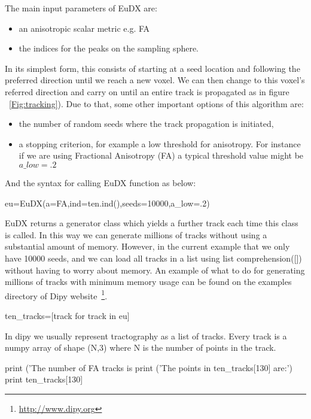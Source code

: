 The main input parameters of EuDX are:

\begin{itemize}
	\item an anisotropic scalar metric e.g. FA
        \item the indices for the peaks on the sampling sphere.
\end{itemize}

In its simplest form, this consists of starting at a seed location and following the preferred direction until we reach a new voxel. We can then change to this voxel’s referred direction and carry on until an entire track is propagated as in figure ~\ref{Fig:tracking}). Due to that, some other important options of this algorithm are:
\begin{itemize}
	\item the number of random seeds where the track propagation is initiated,
        \item a stopping criterion, for example a low threshold for anisotropy. For instance if we are using Fractional Anisotropy (FA) a typical threshold value might be $a\_low=.2$
\end{itemize}

And the syntax for calling EuDX function as below: 
\begin{python}
eu=EuDX(a=FA,ind=ten.ind(),seeds=10000,a_low=.2)
\end{python}


EuDX returns a generator class which yields a further track each time this class is called. In this way we can generate millions of tracks without using a substantial amount of memory. However, in the current example that we only have 10000 seeds, and we can load all tracks in a list using list comprehension([]) without having to worry about memory. An example of what to do for generating millions of tracks with minimum memory usage can be found on the examples directory of Dipy website~\footnote{\url{http://www.dipy.org}}. 

\begin{python}
ten_tracks=[track for track in eu]
\end{python}

In dipy we usually represent tractography as a list of tracks. Every track is a numpy array of shape (N,3) where N is the number of points in the track.

\begin{python}
print ('The number of FA tracks is %
print ('The points in ten_tracks[130] are:')
print ten_tracks[130]
\end{python}

